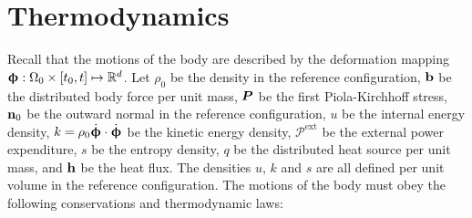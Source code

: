 \section{Thermodynamics}
\label{section: framework/thermodynamics}

Recall that the motions of the body are described by the deformation mapping $\boldsymbol{\upphi}: \Omega_0 \times [t_0, t] \mapsto \mathbb{R}^d$.
Let $\rho_0$ be the density in the reference configuration, $\textbf{b}$ be the distributed body force per unit mass, $\boldsymbol{P}$ be the first Piola-Kirchhoff stress, $\textbf{n}_0$ be the outward normal in the reference configuration, $u$ be the internal energy density, $k = \rho_0 \dot{\boldsymbol{\upphi}} \cdot \dot{\boldsymbol{\upphi}}$ be the kinetic energy density, $\mathcal{P}^\text{ext}$ be the external power expenditure, $s$ be the entropy density, $q$ be the distributed heat source per unit mass, and $\textbf{h}$ be the heat flux. The densities $u$, $k$ and $s$ are all defined per unit volume in the reference configuration.
The motions of the body must obey the following conservations and thermodynamic laws:

